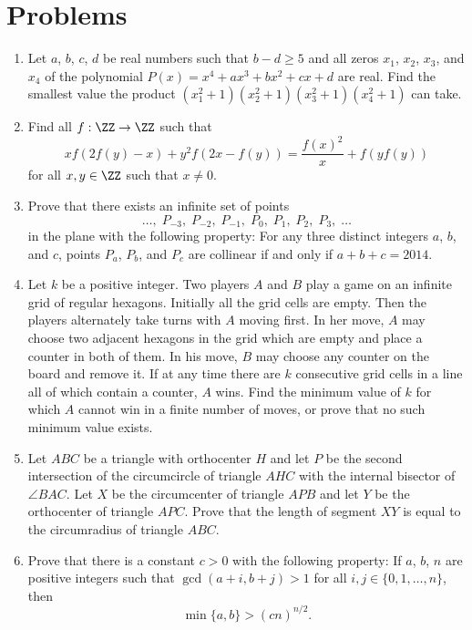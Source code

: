 \documentclass[11pt]{scrartcl}
\begin{document}
\section{Problems}
\begin{enumerate}[\bfseries 1.]
\item %
Let $a$, $b$, $c$, $d$ be real numbers
such that $b-d \ge 5$ and all zeros
$x_1$, $x_2$, $x_3$, and $x_4$ of the polynomial
$P(x)=x^4+ax^3+bx^2+cx+d$ are real.
Find the smallest value the product
$(x_1^2+1)(x_2^2+1)(x_3^2+1)(x_4^2+1)$ can take.

\item %
Find all $f :\ZZ \to \ZZ$ such that
\[
  xf\left( 2f(y)-x \right) + y^2f\left( 2x-f(y) \right)
  = \frac{f(x)^2}{x} + f\left( yf(y) \right)
\]
for all $x,y \in \ZZ$ such that $x \neq 0$.

\item %
Prove that there exists an infinite set of points
\[ \dots, \; P_{-3}, \; P_{-2},\; P_{-1},\; P_0,\; P_1,\; P_2,\; P_3,\; \dots \]
in the plane with the following property:
For any three distinct integers $a$, $b$, and $c$,
points $P_a$, $P_b$, and $P_c$ are collinear if and only if $a+b+c=2014$.

\item %
Let $k$ be a positive integer.
Two players $A$ and $B$ play a game on an infinite grid of regular hexagons.
Initially all the grid cells are empty.
Then the players alternately take turns with $A$ moving first.
In her move, $A$ may choose two adjacent hexagons in the grid
which are empty and place a counter in both of them.
In his move, $B$ may choose any counter on the board and remove it.
If at any time there are $k$ consecutive grid cells
in a line all of which contain a counter, $A$ wins.
Find the minimum value of $k$ for which $A$ cannot
win in a finite number of moves, or prove that no such minimum value exists.

\item %
Let $ABC$ be a triangle with orthocenter $H$ and
let $P$ be the second intersection of the circumcircle of
triangle $AHC$ with the internal bisector of $\angle BAC$.
Let $X$ be the circumcenter of triangle $APB$
and let $Y$ be the orthocenter of triangle $APC$.
Prove that the length of segment $XY$ is equal to
the circumradius of triangle $ABC$.

\item %
Prove that there is a constant $c>0$ with the following property:
If $a$, $b$, $n$ are positive integers such that $\gcd(a+i, b+j)>1$
for all $i, j \in \{0, 1, \dots, n\}$, then
\[ \min\{a, b\}> (cn)^{n/2}. \]

\end{enumerate}
\pagebreak
\end{document}
